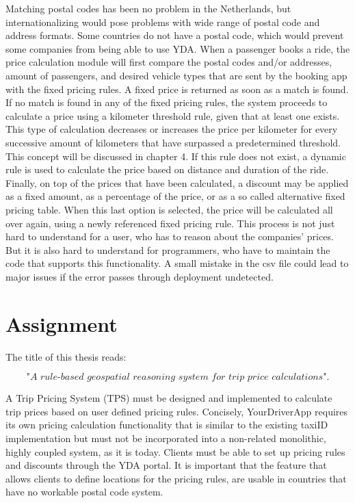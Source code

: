 Matching postal codes has been no problem in the Netherlands, but internationalizing would pose problems with wide range of postal code and address formats. Some countries do not have a postal code, which would prevent some companies from being able to use YDA. When a passenger books a ride, the price calculation module will first compare the postal codes and/or addresses, amount of passengers, and desired vehicle types that are sent by the booking app with the fixed pricing rules. A fixed price is returned as soon as a match is found. If no match is found in any of the fixed pricing rules, the system proceeds to calculate a price using a kilometer threshold rule, given that at least one exists. This type of calculation decreases or increases the price per kilometer for every successive amount of kilometers that have surpassed a predetermined threshold. This concept will be discussed in chapter 4. If this rule does not exist, a dynamic rule is used to calculate the price based on distance and duration of the ride. Finally, on top of the prices that have been calculated, a discount may be applied as a fixed amount, as a percentage of the price, or as a so called alternative fixed pricing table. When this last option is selected, the price will be calculated all over again, using a newly referenced fixed pricing rule. This process is not just hard to understand for a user, who has to reason about the companies' prices. But it is also hard to understand for programmers, who have to maintain the code that supports this functionality. A small mistake in the csv file could lead to major issues if the error passes through deployment undetected.

%
\section{Assignment}
The title of this thesis reads:

\[\textit{"A rule-based geospatial reasoning system for trip price calculations"}.\] \hfill

A Trip Pricing System (TPS) must be designed and implemented to calculate trip prices based on user defined pricing rules. Concisely, YourDriverApp requires its own pricing calculation functionality that is similar to the existing taxiID implementation but must not be incorporated into a non-related monolithic, highly coupled system, as it is today. Clients must be able to set up pricing rules and discounts through the YDA portal. It is important that the feature that allows clients to define locations for the pricing rules, are usable in countries that have no workable postal code system.

